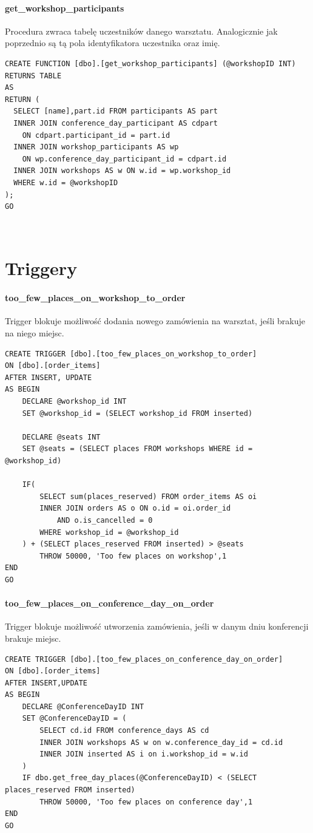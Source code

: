 \documentclass[12pt]{article}
\begin{document}
\paragraph{get\_workshop\_participants \\}
Procedura zwraca tabelę uczestników danego warsztatu. Analogicznie jak poprzednio są tą pola identyfikatora uczestnika oraz imię. \\
\begin{lstlisting}
CREATE FUNCTION [dbo].[get_workshop_participants] (@workshopID INT)
RETURNS TABLE
AS
RETURN (
  SELECT [name],part.id FROM participants AS part
  INNER JOIN conference_day_participant AS cdpart
  	ON cdpart.participant_id = part.id
  INNER JOIN workshop_participants AS wp
  	ON wp.conference_day_participant_id = cdpart.id
  INNER JOIN workshops AS w ON w.id = wp.workshop_id
  WHERE w.id = @workshopID
);
GO
\end{lstlisting}\
\newpage
\section{Triggery}
\paragraph{too\_few\_places\_on\_workshop\_to\_order\\}
Trigger blokuje możliwość dodania nowego zamówienia na warsztat, jeśli brakuje na niego miejsc. \\
\begin{lstlisting}
CREATE TRIGGER [dbo].[too_few_places_on_workshop_to_order]
ON [dbo].[order_items]
AFTER INSERT, UPDATE
AS BEGIN
	DECLARE @workshop_id INT
	SET @workshop_id = (SELECT workshop_id FROM inserted)

	DECLARE @seats INT
	SET @seats = (SELECT places FROM workshops WHERE id = @workshop_id)

	IF(
		SELECT sum(places_reserved) FROM order_items AS oi
		INNER JOIN orders AS o ON o.id = oi.order_id
        	AND o.is_cancelled = 0
		WHERE workshop_id = @workshop_id
	) + (SELECT places_reserved FROM inserted) > @seats
		THROW 50000, 'Too few places on workshop',1
END
GO
\end{lstlisting}
\newpage

\paragraph{too\_few\_places\_on\_conference\_day\_on\_order\\}
Trigger blokuje możliwość utworzenia zamówienia, jeśli w danym dniu konferencji brakuje miejsc.\\
\begin{lstlisting}
CREATE TRIGGER [dbo].[too_few_places_on_conference_day_on_order]
ON [dbo].[order_items]
AFTER INSERT,UPDATE
AS BEGIN
	DECLARE @ConferenceDayID INT
	SET @ConferenceDayID = (
		SELECT cd.id FROM conference_days AS cd
		INNER JOIN workshops AS w on w.conference_day_id = cd.id
		INNER JOIN inserted AS i on i.workshop_id = w.id
	)
	IF dbo.get_free_day_places(@ConferenceDayID) < (SELECT places_reserved FROM inserted)
		THROW 50000, 'Too few places on conference day',1
END
GO
\end{lstlisting}
\newpage
\end{document}
